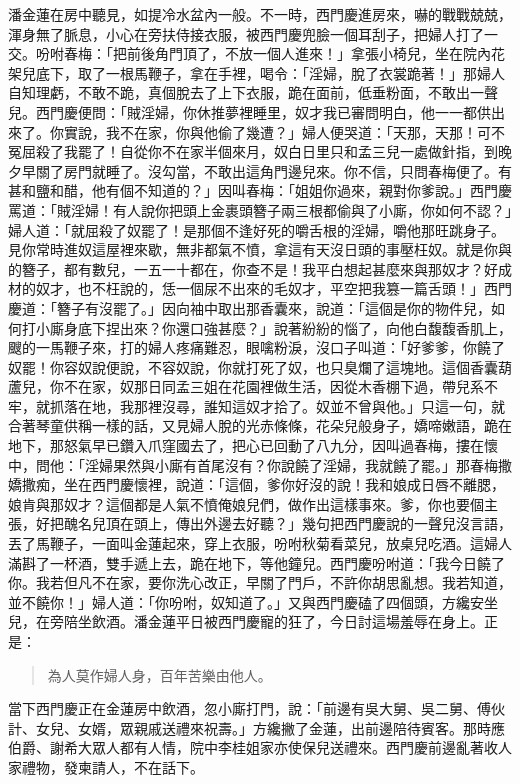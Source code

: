 潘金蓮在房中聽見，如提冷水盆內一般。不一時，西門慶進房來，嚇的戰戰兢兢，渾身無了脈息，小心在旁扶侍接衣服，被西門慶兜臉一個耳刮子，把婦人打了一交。吩咐春梅：「把前後角門頂了，不放一個人進來！」拿張小椅兒，坐在院內花架兒底下，取了一根馬鞭子，拿在手裡，喝令：「淫婦，脫了衣裳跪著！」那婦人自知理虧，不敢不跪，真個脫去了上下衣服，跪在面前，低垂粉面，不敢出一聲兒。西門慶便問：「賊淫婦，你休推夢裡睡里，奴才我已審問明白，他一一都供出來了。你實說，我不在家，你與他偷了幾遭？」婦人便哭道：「天那，天那！可不冤屈殺了我罷了！自從你不在家半個來月，奴白日里只和孟三兒一處做針指，到晚夕早關了房門就睡了。沒勾當，不敢出這角門邊兒來。你不信，只問春梅便了。有甚和鹽和醋，他有個不知道的？」因叫春梅：「姐姐你過來，親對你爹說。」西門慶罵道：「賊淫婦！有人說你把頭上金裹頭簪子兩三根都偷與了小廝，你如何不認？」婦人道：「就屈殺了奴罷了！是那個不逢好死的嚼舌根的淫婦，嚼他那旺跳身子。見你常時進奴這屋裡來歇，無非都氣不憤，拿這有天沒日頭的事壓枉奴。就是你與的簪子，都有數兒，一五一十都在，你查不是！我平白想起甚麼來與那奴才？好成材的奴才，也不枉說的，恁一個尿不出來的毛奴才，平空把我篡一篇舌頭！」西門慶道：「簪子有沒罷了。」因向袖中取出那香囊來，說道：「這個是你的物件兒，如何打小廝身底下捏出來？你還口強甚麼？」說著紛紛的惱了，向他白馥馥香肌上，颼的一馬鞭子來，打的婦人疼痛難忍，眼噙粉淚，沒口子叫道：「好爹爹，你饒了奴罷！你容奴說便說，不容奴說，你就打死了奴，也只臭爛了這塊地。這個香囊葫蘆兒，你不在家，奴那日同孟三姐在花園裡做生活，因從木香棚下過，帶兒系不牢，就抓落在地，我那裡沒尋，誰知這奴才拾了。奴並不曾與他。」只這一句，就合著琴童供稱一樣的話，又見婦人脫的光赤條條，花朵兒般身子，嬌啼嫩語，跪在地下，那怒氣早已鑽入爪窪國去了，把心已回動了八九分，因叫過春梅，摟在懷中，問他：「淫婦果然與小廝有首尾沒有？你說饒了淫婦，我就饒了罷。」那春梅撒嬌撒痴，坐在西門慶懷裡，說道：「這個，爹你好沒的說！我和娘成日唇不離腮，娘肯與那奴才？這個都是人氣不憤俺娘兒們，做作出這樣事來。爹，你也要個主張，好把醜名兒頂在頭上，傳出外邊去好聽？」幾句把西門慶說的一聲兒沒言語，丟了馬鞭子，一面叫金蓮起來，穿上衣服，吩咐秋菊看菜兒，放桌兒吃酒。這婦人滿斟了一杯酒，雙手遞上去，跪在地下，等他鐘兒。西門慶吩咐道：「我今日饒了你。我若但凡不在家，要你洗心改正，早關了門戶，不許你胡思亂想。我若知道，並不饒你！」婦人道：「你吩咐，奴知道了。」又與西門慶磕了四個頭，方纔安坐兒，在旁陪坐飲酒。潘金蓮平日被西門慶寵的狂了，今日討這場羞辱在身上。正是：
\begin{quote}
為人莫作婦人身，百年苦樂由他人。
\end{quote}

當下西門慶正在金蓮房中飲酒，忽小廝打門，說：「前邊有吳大舅、吳二舅、傅伙計、女兒、女婿，眾親戚送禮來祝壽。」方纔撇了金蓮，出前邊陪待賓客。那時應伯爵、謝希大眾人都有人情，院中李桂姐家亦使保兒送禮來。西門慶前邊亂著收人家禮物，發柬請人，不在話下。

